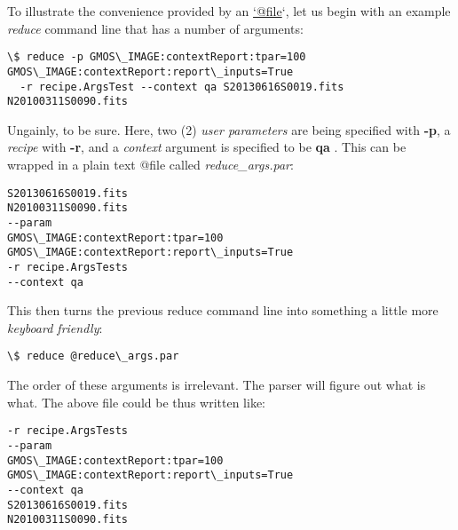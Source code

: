 \documentclass[letterpaper,10pt,english]{sphinxmanual}
\begin{document}
To illustrate the convenience provided by an \href{mailto:'@file}{`@file}`, let us begin with an
example \emph{reduce} command line that has a number of arguments:

\begin{Verbatim}[commandchars=\\\{\}]
\$ reduce -p GMOS\_IMAGE:contextReport:tpar=100 GMOS\_IMAGE:contextReport:report\_inputs=True
  -r recipe.ArgsTest --context qa S20130616S0019.fits N20100311S0090.fits
\end{Verbatim}

Ungainly, to be sure. Here, two (2) \emph{user parameters} are being specified
with \textbf{-p}, a \emph{recipe} with \textbf{-r}, and a \emph{context} argument is specified
to be \textbf{qa} . This can be wrapped in a plain text @file called
\emph{reduce\_args.par}:

\begin{Verbatim}[commandchars=\\\{\}]
S20130616S0019.fits
N20100311S0090.fits
--param
GMOS\_IMAGE:contextReport:tpar=100
GMOS\_IMAGE:contextReport:report\_inputs=True
-r recipe.ArgsTests
--context qa
\end{Verbatim}

This then turns the previous reduce command line into something a little more
\emph{keyboard friendly}:

\begin{Verbatim}[commandchars=\\\{\}]
\$ reduce @reduce\_args.par
\end{Verbatim}

The order of these arguments is irrelevant. The parser will figure out what is
what. The above file could be thus written like:

\begin{Verbatim}[commandchars=\\\{\}]
-r recipe.ArgsTests
--param
GMOS\_IMAGE:contextReport:tpar=100
GMOS\_IMAGE:contextReport:report\_inputs=True
--context qa
S20130616S0019.fits
N20100311S0090.fits
\end{Verbatim}
\end{document}
